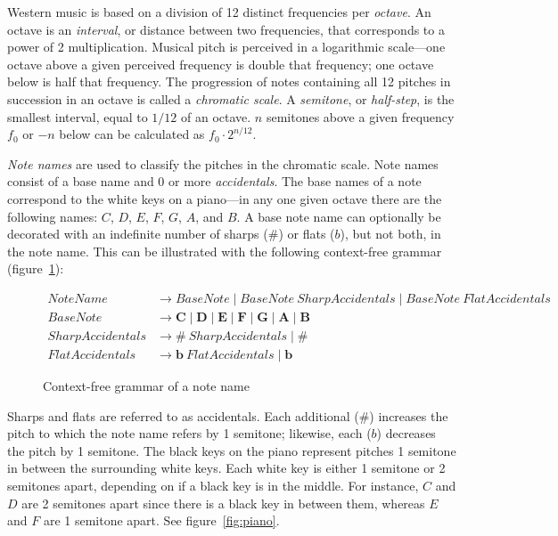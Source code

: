 Western music is based on a division of 12 distinct frequencies per \textit{octave}. An octave is an \textit{interval}, or distance between two frequencies, that corresponds to a power of 2 multiplication. Musical pitch is perceived in a logarithmic scale---one octave above a given perceived frequency is double that frequency; one octave below is half that frequency. The progression of notes containing all 12 pitches in succession in an octave is called a \textit{chromatic scale}. A \textit{semitone}, or \textit{half-step}, is the smallest interval, equal to $1/12$ of an octave. $n$ semitones above a given frequency $f_0$ or $-n$ below can be calculated as $f_0 \cdot 2^{n/12}$.

\textit{Note names} are used to classify the pitches in the chromatic scale. Note names consist of a base name and 0 or more \textit{accidentals}. The base names of a note correspond to the white keys on a piano---in any one given octave there are the following names: $C$, $D$, $E$, $F$, $G$, $A$, and $B$. A base note name can optionally be decorated with an indefinite number of sharps ($\#$) or flats ($b$), but not both, in the note name. This can be illustrated with the following context-free grammar (figure~\ref{fig:cfgnote}):

\begin{figure}[h!]
\begin{center}
\begin{align*}
NoteName &\to BaseNote \mid BaseNote\ SharpAccidentals \mid BaseNote\ FlatAccidentals \\
BaseNote &\to \mathbf{C} \mid \mathbf{D} \mid \mathbf{E} \mid \mathbf{F} \mid \mathbf{G} \mid \mathbf{A} \mid \mathbf{B} \\
SharpAccidentals &\to \bm{\textit{\#}}\ SharpAccidentals \mid \bm{\textit{\#}} \\
FlatAccidentals &\to \bm{b}\ FlatAccidentals \mid \bm{b}
\end{align*}
\caption{Context-free grammar of a note name}
\label{fig:cfgnote}
\end{center}
\end{figure}

Sharps and flats are referred to as accidentals. Each additional ($\#$) increases the pitch to which the note name refers by 1 semitone; likewise, each ($b$) decreases the pitch by 1 semitone.  The black keys on the piano represent pitches 1 semitone in between the surrounding white keys. Each white key is either 1 semitone or 2 semitones apart, depending on if a black key is in the middle. For instance, $C$ and $D$ are 2 semitones apart since there is a black key in between them, whereas $E$ and $F$ are 1 semitone apart. See figure~\ref{fig:piano}.
